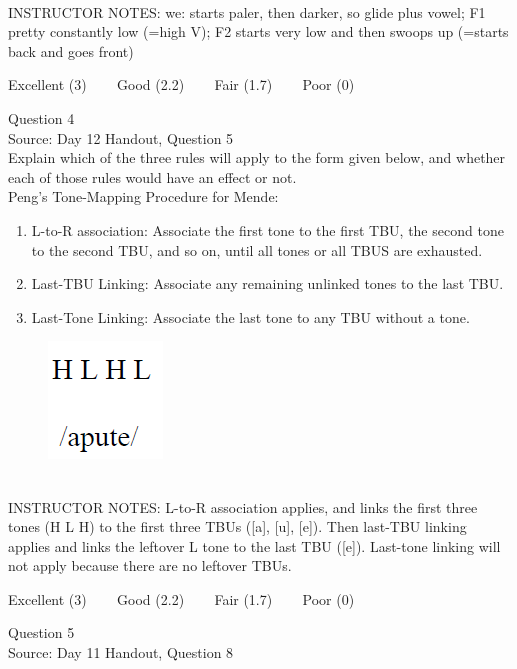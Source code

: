 \documentclass[12pt]{article}
\begin{document}
~\\
INSTRUCTOR NOTES: we: starts paler, then darker, so glide plus vowel; F1 pretty constantly low (=high V); F2 starts very low and then swoops up (=starts back and goes front)


\vfill
Excellent (3) ~~~ Good (2.2) ~~~ Fair (1.7) ~~~ Poor (0)
\newpage

{\large Question 4}\\

Source: Day 12 Handout, Question 5\\

Explain which of the three rules will apply to the form given below, and whether each of those rules would have an effect or not.\\

Peng’s Tone-Mapping Procedure for Mende: \begin{enumerate} \item L-to-R association: Associate the first tone to the first TBU, the second tone to the second TBU, and so on, until all tones or all TBUS are exhausted. \item Last-TBU Linking: Associate any remaining unlinked tones to the last TBU. \item Last-Tone Linking: Associate the last tone to any TBU without a tone. \end{enumerate}

\begin{figure}[H]
\includegraphics{../images/mendetone_d.png}
\end{figure}

~\\
INSTRUCTOR NOTES: L-to-R association applies, and links the first three tones (H L H) to the first three TBUs ([a], [u], [e]). Then last-TBU linking applies and links the leftover L tone to the last TBU ([e]). Last-tone linking will not apply because there are no leftover TBUs.


\vfill
Excellent (3) ~~~ Good (2.2) ~~~ Fair (1.7) ~~~ Poor (0)
\newpage

{\large Question 5}\\

Source: Day 11 Handout, Question 8\\
\end{document}

